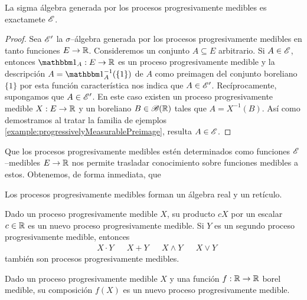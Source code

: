 \begin{theorem}
  La sigma álgebra generada por los procesos progresivamente medibles es exactamete \(\mathscr{E}\).
\end{theorem}
\begin{proof}
  Sea \(\mathscr{E}'\) la \(\sigma\)--álgebra generada por los procesos progresivamente medibles en tanto funciones \(E \rightarrow \mathbb{R}\).
  Consideremos un conjunto \(A \subseteq E\) arbitrario.
  Si \(A \in \mathscr{E}\), entonces \(\characteristic_A : E \rightarrow \realNumbers\) es un proceso progresivamente medible y la descripción \(A = \characteristic_A^{- 1}(\{1\})\) de \(A\) como preimagen del conjunto boreliano \(\{1\}\) por esta función característica nos indica que \(A \in \mathscr{E}'\).
  Recíprocamente, supongamos que \(A \in \mathscr{E}'\).
  En este caso existen un proceso progresivamente medible \(X : E \rightarrow \mathbb{R}\) y un boreliano \(B \in \mathscr{B}(\mathbb{R})\) tales que \(A = X^{- 1}(B)\).
  Así como demostramos al tratar la familia de ejemplos \ref{example:progressivelyMeasurablePreimage}, resulta \(A \in \mathscr{E}\). 
\end{proof}


Que los procesos progresivamente medibles estén determinados como funciones \(\mathscr{E}\)--medibles \(E \rightarrow \mathbb{R}\) nos permite trasladar conocimiento sobre funciones medibles a estos.
Obtenemos, de forma inmediata, que 

\begin{theorem}
  \label{theorem:algebraOfProgressiveProcesses}
  Los procesos progresivamente medibles forman un álgebra real y un retículo.

  Dado un proceso progresivamente medible \(X\), su producto \(c X\) por un escalar \(c \in \mathbb{R}\) es un nuevo proceso progresivamente medible.
  Si \(Y\) es un segundo proceso progresivamente medible, entonces
  \begin{align}
    & X \cdot Y
    &&  X + Y
    &&  X \wedge Y
    && X \vee Y
  \end{align}
  también son procesos progresivamente medibles.
\end{theorem}

\begin{theorem}
  Dado un proceso progresivamente medible \(X\) y una función \(f : \mathbb{R} \rightarrow \mathbb{R}\) borel medible, su composición \(f(X)\) es un nuevo proceso progresivamente medible.
\end{theorem}

